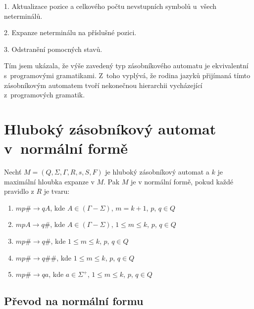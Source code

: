 \begin{list}{}{\setlength\parsep{0cm} \setlength\itemsep{0cm} \setlength\leftmargin{1em}}
\item 1. Aktualizace pozice a celkového počtu nevstupních symbolů u~všech neterminálů.
\item 2. Expanze neterminálu na příslušné pozici.
\item 3. Odstranění pomocných stavů.
\end{list}

Tím jsem ukázala, že výše zavedený typ zásobníkového automatu je ekvivalentní s~programovými gramatikami. Z~toho vyplývá, že rodina jazyků přijímaná tímto zásobníkovým automatem tvoří nekonečnou hierarchii vycházející z~programových gramatik.

\chapter{Hluboký zásobníkový automat v~normální formě}

\begin{Def}
Nechť $M = (Q,\Sigma,\Gamma, R, s, S , F)$ je hluboký zásobníkový automat
a $k$ je maximální hloubka expanze v $M$.
Pak $M$ je v normální formě, pokud každé pravidlo z $R$ je tvaru:

\begin{enumerate}
\renewcommand{\labelenumi}{(\roman{enumi})}
\item $mp\# \rightarrow qA$, kde $A \in (\Gamma - \Sigma)$, $m = k + 1$, $p$, $q \in Q$
\item $mpA \rightarrow q\#$, kde $A \in (\Gamma - \Sigma)$, $1 \le m \le k$, $p$, $q \in Q$
\item $mp\# \rightarrow q\#$, kde $1 \le m \le k$, $p$, $q \in Q$
\item $mp\# \rightarrow q\#\#$, kde $1 \le m \le k$, $p$, $q \in Q$
\item $mp\# \rightarrow qa$, kde $a \in {\Sigma}^+$, $1 \le m \le k$, $p$, $q \in Q$

\end{enumerate}

\end{Def}


\section{Převod na normální formu}

